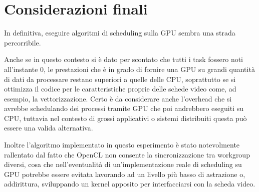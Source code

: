\documentclass[../relazione.tex]{subfiles}
\begin{document}
\section{Considerazioni finali}
In definitiva, eseguire algoritmi di scheduling sulla GPU sembra una strada percorribile.

Anche se in questo contesto si è dato per scontato che tutti i task fossero noti all'instante 0, le prestazioni che è in grado di fornire una GPU su grandi quantità di dati da processare restano superiori a quelle delle CPU, soprattutto se si ottimizza il codice per le caratteristiche proprie delle schede video come, ad esempio, la vettorizzazione. Certo è da considerare anche l'overhead che si avrebbe schedulando dei processi tramite GPU che poi andrebbero eseguiti su CPU, tuttavia nel contesto di grossi applicativi o sistemi distribuiti questa può essere una valida alternativa.

Inoltre l'algoritmo implementato in questo esperimento è stato notevolmente rallentato dal fatto che OpenCL non consente la sincronizzazione tra workgroup diversi, cosa che nell'eventualità di un'implementazione reale di scheduling su GPU potrebbe essere evitata lavorando ad un livello più basso di astrazione o, addirittura, sviluppando un kernel apposito per interfacciarsi con la scheda video.
\end{document}
